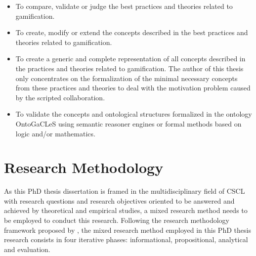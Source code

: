 \begin{itemize}
\item
To compare, validate or judge the best practices and theories related to gamification.

\item
To create, modify or extend the concepts described in the best practices and theories related to gamification.

\item
To create a generic and complete representation of all concepts described in the practices and theories related to gamification. The author of this thesis only concentrates on the formalization of the minimal necessary concepts from these practices and theories to deal with the motivation problem caused by the scripted collaboration.

\item
To validate the concepts and ontological structures formalized in the ontology OntoGaCLeS using semantic reasoner engines or formal methods based on logic and/or mathematics.
\end{itemize}

\section{Research Methodology}
\label{sec:research-methodology}

As this PhD thesis dissertation is framed in the multidisciplinary field of CSCL with research questions and research objectives oriented to be answered and achieved by theoretical and empirical studies, a mixed research method needs to be employed to conduct this research. Following the research methodology framework proposed by , the mixed research method employed in this PhD thesis research consists in four iterative phases: informational, propositional, analytical and evaluation.

